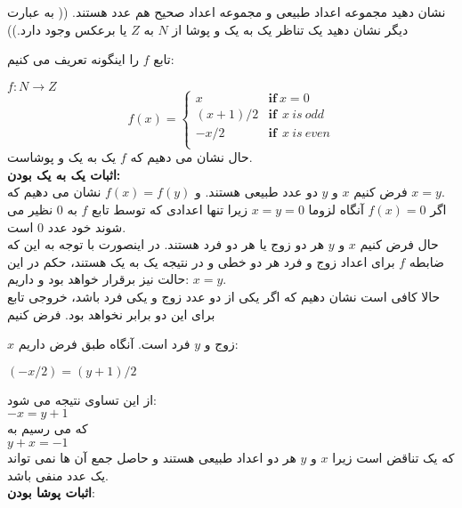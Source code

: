 
نشان دهید مجموعه اعداد طبیعی و مجموعه اعداد صحیح هم عدد هستند. (( به عبارت دیگر نشان دهید یک تناظر یک به یک و پوشا از  
$N$
به 
$Z$
یا برعکس وجود دارد.))
\begin{solution}
    تابع 
    $f$
    را اینگونه تعریف می کنیم:

    $f:N\xrightarrow{} Z$
    \[
    f(x) = 
    \begin{cases}
        x & \textbf{if} \ x = 0\\
        (x+1)/2 & \textbf{if} \ \ x \ is \ odd\\
        -x/2 & \textbf{if} \ \ x \ is \ even\\
    \end{cases}
    \]
    حال نشان می دهیم که 
    $f$
    یک به یک و پوشاست.
    \\
    \textbf{اثبات یک به یک بودن:}\\
    فرض کنیم 
    $x$
    و
    $y$
    دو عدد طبیعی هستند. و 
    $f(x) = f(y)$
    نشان می دهیم که 
    $x = y$.
    \\
    اگر 
    $f(x) = 0$
    آنگاه لزوما
    $x = y = 0$
    زیرا تنها اعدادی که توسط تابع 
    $f$
    به 
    $0$
    نظیر می شوند خود عدد 
    $0$
    است.
    \\
    حال فرض کنیم 
    $x$
    و
    $y$
    هر دو زوج یا هر دو فرد هستند. در اینصورت با توجه به این که ضابطه 
    $f$
    برای اعداد زوج و فرد هر دو خطی و در نتیجه یک به یک هستند، حکم در این حالت نیز برقرار خواهد بود و داریم:
    $x = y$.
    \\
    حالا کافی است نشان دهیم که اگر یکی از دو عدد زوج و یکی فرد باشد، خروجی تابع برای این دو برابر نخواهد بود. فرض کنیم 
    
    $x$
    زوج و
    $y$
    فرد است. آنگاه طبق فرض داریم:

    $(-x/2) = (y+1)/2$

    از این تساوی نتیجه می شود:\\
    $-x = y+1$
    \\
    که می رسیم به
    \\
    $y+x = -1$
    \\
    که یک تناقض است زیرا
    $x$
    و
    $y$
    هر دو اعداد طبیعی هستند و حاصل جمع آن ها نمی تواند یک عدد منفی باشد.
    \\
    \textbf{اثبات پوشا بودن}:\\


\end{solution}
